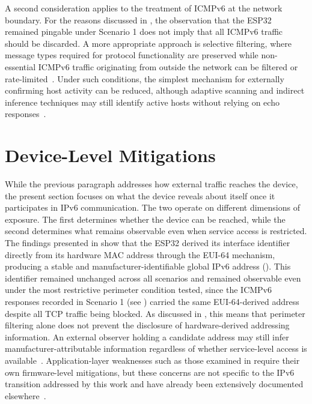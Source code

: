 A second consideration applies to the treatment of ICMPv6 at the network boundary. For the reasons discussed in , the observation that the ESP32 remained pingable under Scenario 1 does not imply that all ICMPv6 traffic should be discarded. A more appropriate approach is selective filtering, where message types required for protocol functionality are preserved while non-essential ICMPv6 traffic originating from outside the network can be filtered or rate-limited~\cite{rfc4890}. Under such conditions, the simplest mechanism for externally confirming host activity can be reduced, although adaptive scanning and indirect inference techniques may still identify active hosts without relying on echo responses~\cite{pan2023router,williams20246sense}.

\section{Device-Level Mitigations}\label{sec:device-mitigations}

While the previous paragraph addresses how external traffic reaches the device, the present section focuses on what the device reveals about itself once it participates in IPv6 communication. The two operate on different dimensions of exposure. The first determines whether the device can be reached, while the second determines what remains observable even when service access is restricted. The findings presented in  show that the ESP32 derived its interface identifier directly from its hardware MAC address through the EUI-64 mechanism, producing a stable and manufacturer-identifiable global IPv6 address (). This identifier remained unchanged across all scenarios and remained observable even under the most restrictive perimeter condition tested, since the ICMPv6 responses recorded in Scenario 1 (see ) carried the same EUI-64-derived address despite all TCP traffic being blocked. As discussed in , this means that perimeter filtering alone does not prevent the disclosure of hardware-derived addressing information. An external observer holding a candidate address may still infer manufacturer-attributable information regardless of whether service-level access is available~\cite{rye2023ipvseeyou}. Application-layer weaknesses such as those examined in  require their own firmware-level mitigations, but these concerns are not specific to the IPv6 transition addressed by this work and have already been extensively documented elsewhere~\cite{costin2014firmware,alrawi2019sok}.

